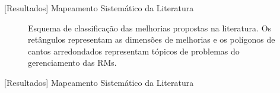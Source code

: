 \documentclass[t,14pt,mathserif]{beamer}
\begin{document}
\begin{frame}{[Resultados] Mapeamento Sistemático da Literatura}

    \begin{figure}[tb] \centering
        \caption{Esquema de classificação das melhorias propostas na literatura.
            Os retângulos representam as dimensões de melhorias e os polígonos
            de cantos arredondados representam tópicos de problemas do
            gerenciamento das RMs.}\label{fig:diagrama-esquema-dimensao-melhorias}
    \end{figure}
\end{frame}

\begin{frame}{[Resultados] Mapeamento Sistemático da Literatura}

    \begin{table}[htpb]
    \centering
    \caption{Total de artigos por papel na manutenção de software}
\label{tab:graf_papel_por_artigo}
    \end{table}

\end{frame}
\end{document}

